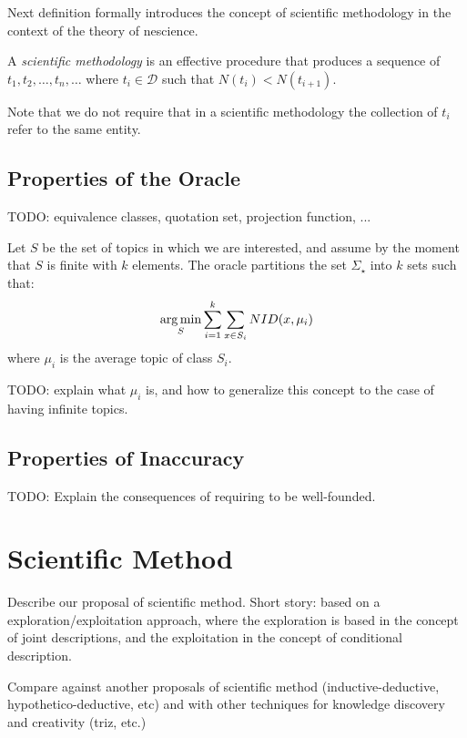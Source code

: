 Next definition formally introduces the concept of scientific methodology in the context of the theory of nescience.

\begin{definition}
A \emph{scientific methodology} is an effective procedure that produces a sequence of $t_1, t_2, \ldots, t_n, \ldots$ where $t_i \in \mathcal{D}$ such that $N(t_i) < N(t_{i+1})$.
\end{definition}

Note that we do not require that in a scientific methodology the collection of $t_i$ refer to the same entity.


\subsection{Properties of the Oracle}

{\color{red} TODO: equivalence classes, quotation set, projection function, ...}

Let $S$ be the set of topics in which we are interested, and assume by the moment that $S$ is finite with $k$ elements. The oracle partitions the set $\Sigma_\star$ into $k$ sets such that:
\[
\operatorname*{arg\,min}_S \sum_{i=1}^k \sum_{x \in S_i} NID(x, \mu_i)
\]
where $\mu_i$ is the average topic of class $S_i$.

{\color{red} TODO: explain what $\mu_i$ is, and how to generalize this concept to the case of having infinite topics.}


\subsection{Properties of Inaccuracy}

{\color{red} TODO: Explain the consequences of requiring to be well-founded.}

%
%

\section{Scientific Method}

{\color{red} Describe our proposal of scientific method. Short story: based on a exploration/exploitation approach, where the exploration is based in the concept of joint descriptions, and the exploitation in the concept of conditional description.}

{\color{red} Compare against another proposals of scientific method (inductive-deductive, hypothetico-deductive, etc) and with other techniques for knowledge discovery and creativity (triz, etc.)}

